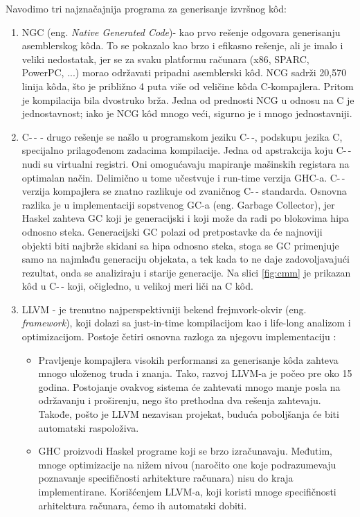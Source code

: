 Navodimo tri najznačajnija programa za generisanje izvršnog k\^{o}d:
\begin{enumerate}
	\item  NGC (eng.\emph{ Native Generated Code})- kao prvo rešenje odgovara generisanju asemblerskog k\^{o}da. To se pokazalo kao brzo i efikasno rešenje, ali je imalo i veliki nedostatak, jer se za svaku platformu računara (x86, SPARC, PowerPC, ...) morao održavati pripadni asemblerski k\^{o}d.
	NCG sadrži 20,570 linija k\^{o}da, što je približno 4 puta više od veličine k\^{o}da C-kompajlera. Pritom je kompilacija bila dvostruko brža. Jedna od prednosti NCG u odnosu na C je jednostavnost; iako je NCG k\^{o}d mnogo veći, sigurno je i mnogo jednostavniji.
	\item  C-\,- - drugo rešenje se našlo u programskom jeziku C-\,-, podskupu jezika C, specijalno prilagođenom zadacima kompilacije. Jedna od apstrakcija koju C-\,- nudi su virtualni registri. Oni omogućavaju mapiranje mašinskih registara na optimalan način. Delimično u tome učestvuje i run-time verzija GHC-a. C-\,- verzija kompajlera se znatno razlikuje od zvaničnog C-\,- standarda. Osnovna razlika je u  implementaciji sopstvenog GC-a (eng. Garbage Collector), jer Haskel zahteva GC koji je generacijski i koji može da radi po blokovima hipa odnosno steka. Generacijski GC polazi od pretpostavke da će najnoviji objekti biti najbrže skidani sa hipa odnosno steka, stoga se GC primenjuje samo na najmlađu generaciju objekata, a tek kada to ne daje zadovoljavajući rezultat, onda se analiziraju i starije generacije. Na slici \ref{fig:cmm} je prikazan k\^{o}d u C-\,- koji, očigledno, u velikoj meri liči na C k\^{o}d. 
	\item LLVM - je trenutno najperspektivniji bekend frejmvork-okvir (eng. \emph{framework}), koji dolazi sa just-in-time kompilacijom kao i life-long analizom i optimizacijom. Postoje četiri osnovna razloga za njegovu implementaciju \cite{Ter10}:
	\begin{itemize}
		\item Pravljenje kompajlera visokih performansi za generisanje k\^{o}da zahteva mnogo uloženog truda i znanja. Tako, razvoj LLVM-a je počeo pre oko 15 godina. Postojanje ovakvog sistema će zahtevati mnogo manje posla na održavanju i proširenju, nego što prethodna dva rešenja zahtevaju. Takođe, pošto je LLVM nezavisan projekat, buduća poboljšanja će biti automatski raspoloživa. 
		\item GHC proizvodi Haskel programe koji se brzo izračunavaju. Međutim, mnoge optimizacije na nižem nivou (naročito one koje podrazumevaju poznavanje specifičnosti arhitekture računara) nisu do kraja implementirane. Korišćenjem LLVM-a, koji koristi mnoge specifičnosti arhitektura računara, ćemo ih automatski dobiti.

\end{itemize}
\end{enumerate}
